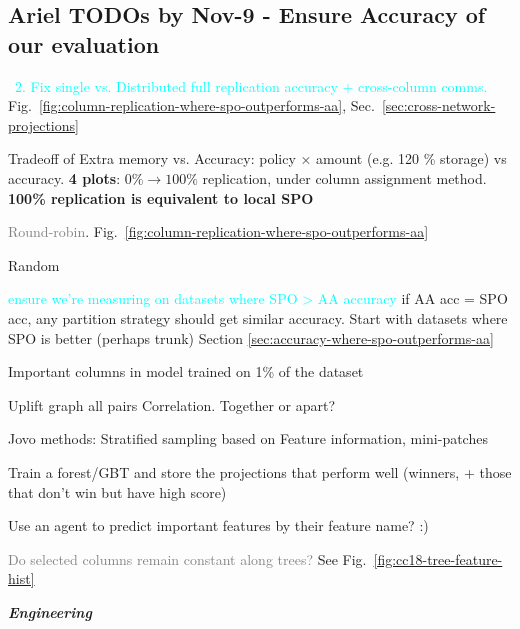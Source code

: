 \documentclass[sigconf,screen]{acmart}
\newcommand{\done}{\rlap{$\square$}{\raisebox{2pt}{\large\hspace{1pt}\checkmark}}\hspace{-2.5pt}}
\begin{document}
\subsection{Ariel TODOs by Nov-9 - Ensure Accuracy of our evaluation}



\textcolor{cyan}{\done~2. Fix single vs. Distributed full replication accuracy + cross-column comms.} Fig.~\ref{fig:column-replication-where-spo-outperforms-aa}, Sec.~\ref{sec:cross-network-projections}

Tradeoff of Extra memory vs. Accuracy: policy × amount (e.g. 120 \% storage) vs accuracy. \textbf{4 plots}: $0\% \to 100\%$ replication, under column assignment method. \textbf{100\% replication is equivalent to local SPO}
    \begin{todolist}
        \item[\textcolor{gray}{\done}] \textcolor{gray}{Round-robin}. Fig.~\ref{fig:column-replication-where-spo-outperforms-aa}
        \item Random
        \item[\done] \textcolor{cyan}{ensure we're measuring on datasets where SPO > AA accuracy} if AA acc = SPO acc, any partition strategy should get similar accuracy. Start with datasets where SPO is better (perhaps trunk) Section \ref{sec:accuracy-where-spo-outperforms-aa}
        \item Important columns in model trained on 1\% of the dataset
        \item Uplift graph all pairs Correlation. Together or apart?
        \item Jovo methods: Stratified sampling based on Feature information, mini-patches
        \item Train a forest/GBT and store the projections that perform well (winners, + those that don't win but have high score)
        \item Use an agent to predict important features by their feature name? :)
        \item[\textcolor{gray}{\done}] \textcolor{gray}{Do selected columns remain constant along trees?} See Fig.~\ref{fig:cc18-tree-feature-hist}
    \end{todolist}

\textbf{\textit{Engineering}}
\end{document}
